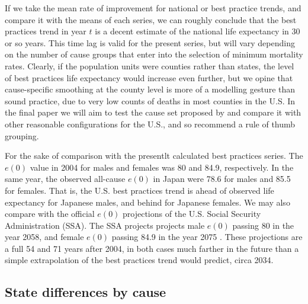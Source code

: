\documentclass[11pt,oneside,a4paper]{article} %
\begin{document}
If we take the mean rate of improvement for national or best practice trends,
and compare it with the means of each series, we can roughly conclude that the
best practices trend in year $t$ is a decent estimate of the national life
expectancy in 30 or so years. This time lag is valid for the present series,
but will vary depending on the number of cause groups that enter into the
selection of minimum mortality rates. Clearly, if the population units were
counties rather than states, the level of best practices life expectancy would
increase even further, but we opine that cause-specific smoothing at the county
level is more of a modelling gesture than sound practice, due to very low counts of deaths in
most counties in the U.S. In the final paper we will aim to test the cause set
proposed by \citet{vallin2008minimum} and compare it with other reasonable
configurations for the U.S., and so recommend a rule of thumb grouping. 

For the sake of comparison with the presentlt calculated best practices series.
The $e(0)$ value in 2004 for males and females was 80 and 84.9, respectively. In
the same year, the observed all-cause $e(0)$ in Japan were 78.6 for males and
85.5 for females. That is, the U.S. best practices trend is ahead of observed
life expectancy for Japanese males, and behind for Japanese females. We may also
compare with the official $e(0)$ projections of the U.S. Social Security
Administration (SSA). The SSA projects projects male $e(0)$ passing 80 in the
year 2058, and female $e(0)$
passing 84.9 in the year 2075 \citep{SSA2005}. These projections are a full 54
and 71 years after 2004, in both cases much farther in the future than a simple extrapolation
of the best practices trend would predict, circa 2034.

\FloatBarrier
\subsection*{State differences by cause}
\end{document}
